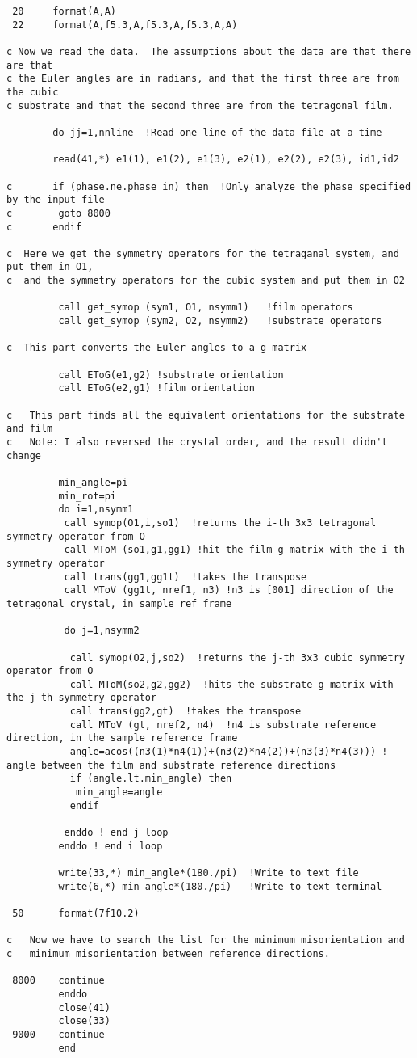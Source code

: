 \begin{lstlisting}
 20     format(A,A)	
 22     format(A,f5.3,A,f5.3,A,f5.3,A,A) 
 		
c Now we read the data.  The assumptions about the data are that there are that
c the Euler angles are in radians, and that the first three are from the cubic
c substrate and that the second three are from the tetragonal film. 

        do jj=1,nnline  !Read one line of the data file at a time

		read(41,*) e1(1), e1(2), e1(3), e2(1), e2(2), e2(3), id1,id2
		
c		if (phase.ne.phase_in) then  !Only analyze the phase specified by the input file
c		 goto 8000
c		endif

c  Here we get the symmetry operators for the tetraganal system, and put them in O1, 
c  and the symmetry operators for the cubic system and put them in O2

         call get_symop (sym1, O1, nsymm1)	 !film operators 
	     call get_symop (sym2, O2, nsymm2)	 !substrate operators 

c  This part converts the Euler angles to a g matrix

         call EToG(e1,g2) !substrate orientation
		 call EToG(e2,g1) !film orientation

c   This part finds all the equivalent orientations for the substrate and film
c   Note: I also reversed the crystal order, and the result didn't change

         min_angle=pi
		 min_rot=pi
         do i=1,nsymm1	
		  call symop(O1,i,so1)  !returns the i-th 3x3 tetragonal symmetry operator from O  
		  call MToM (so1,g1,gg1) !hit the film g matrix with the i-th symmetry operator	
		  call trans(gg1,gg1t)  !takes the transpose
		  call MToV (gg1t, nref1, n3) !n3 is [001] direction of the tetragonal crystal, in sample ref frame

          do j=1,nsymm2
		  
		   call symop(O2,j,so2)  !returns the j-th 3x3 cubic symmetry operator from O	   
		   call MToM(so2,g2,gg2)  !hits the substrate g matrix with the j-th symmetry operator	
		   call trans(gg2,gt)  !takes the transpose
		   call MToV (gt, nref2, n4)  !n4 is substrate reference direction, in the sample reference frame
           angle=acos((n3(1)*n4(1))+(n3(2)*n4(2))+(n3(3)*n4(3))) ! angle between the film and substrate reference directions
		   if (angle.lt.min_angle) then
		    min_angle=angle
		   endif	

		  enddo ! end j loop
		 enddo ! end i loop
		  		  
		 write(33,*) min_angle*(180./pi)  !Write to text file
		 write(6,*) min_angle*(180./pi)	  !Write to text terminal		 
		  
 50      format(7f10.2)

c   Now we have to search the list for the minimum misorientation and
c   minimum misorientation between reference directions.

 8000    continue		 
         enddo
		 close(41)
         close(33)
 9000    continue  
         end

  \end{lstlisting}
  
